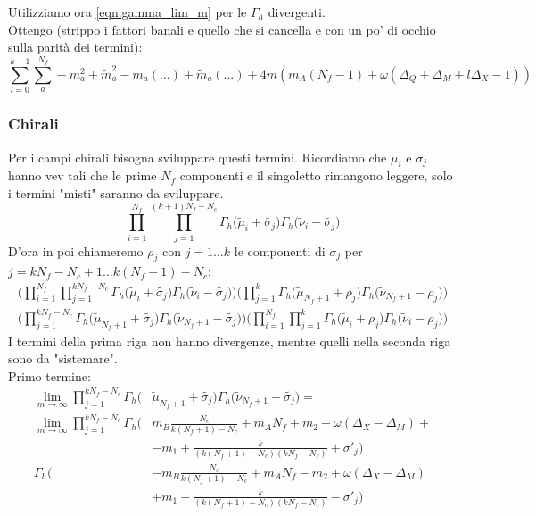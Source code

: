 \documentclass[a4paper,12pt]{article}
\begin{document}
Utilizziamo ora \ref{eqn:gamma_lim_m} per le $\Gamma_h$ divergenti.\\
Ottengo (strippo i fattori banali e quello che si cancella e con un po' di occhio sulla parità dei termini):
\begin{equation}
\sum_{l=0}^{k-1} \sum_a^{N_f}  - m_a^2 + \tilde{m}_a^2  -  m_a(\dots) + \tilde{m}_a(\dots) + 4  m ( m_A (N_f - 1)  + \omega( \Delta_Q +  \Delta_M + l\Delta_X  -1)  )
\label{eqn:contributo_mesoni}
\end{equation}

\subsubsection{Chirali}
Per i campi chirali bisogna sviluppare questi termini. Ricordiamo che $\mu_i$ e $\sigma_j$ hanno vev tali che le prime $N_f$ componenti e il singoletto rimangono leggere, solo i termini "misti" saranno da sviluppare.  
\begin{equation}
\prod_{i=1}^{N_f} \prod_{j=1}^{(k+1)N_f - N_c } \Gamma_h \big( \tilde \mu_i + \tilde{\sigma_j} \big) \Gamma_h \big( \tilde \nu_i - \tilde{\sigma_j} \big)  
\end{equation}
D'ora in poi chiameremo $\rho_j$ con $j= 1 \dots k$ le componenti di $\sigma_j$ per $ j = k N_f - N_c + 1 \dots k(N_f+1) -N_c$:
\begin{align*}
\bigg( \prod_{i=1}^{N_f} \prod_{j=1}^{k N_f - N_c } \Gamma_h \big( \tilde \mu_i + \tilde{\sigma_j} \big) \Gamma_h \big( \tilde \nu_i - \tilde{\sigma_j} \big) \bigg)
\bigg(\prod_{j=1}^{k} \Gamma_h \big( \tilde \mu_{N_f+1} + \rho_j \big) \Gamma_h \big( \tilde \nu_{N_f+1} - \rho_j \big) \bigg)\\
\bigg( \prod_{j=1}^{k N_f - N_c}   \Gamma_h \big( \tilde \mu_{N_f+1} + \tilde{\sigma_j} \big) \Gamma_h \big( \tilde \nu_{N_f+1} - \tilde{\sigma_j} \big) \bigg)
\bigg( \prod_{i=1}^{N_f} \prod_{j=1}^{k } \Gamma_h \big( \tilde \mu_i + \rho_j \big) \Gamma_h \big( \tilde \nu_i - \rho_j \big) \bigg)
\end{align*}
I termini della prima riga non hanno divergenze, mentre quelli nella seconda riga sono da "sistemare".\\
Primo termine:
\begin{align*}
\lim_{m \rightarrow \infty} \prod_{j=1}^{k N_f - N_c}   \Gamma_h \big(& \tilde \mu_{N_f+1} + \tilde{\sigma_j} \big) \Gamma_h \big( \tilde \nu_{N_f+1} - \tilde{\sigma_j} \big) =  \\
 \lim_{m \rightarrow \infty} \prod_{j=1}^{k N_f - N_c}   \Gamma_h \big(& m_B \frac{N_c}{k(N_f+1)-N_c } + m_A N_f + m_2 + \omega ( \Delta_X - \Delta_M) + \\
& - m_1  + \frac{k}{(k(N_f+1)-N_c) (k N_f - N_c) } + \sigma'_j \big) 
 \\
 \Gamma_h \big( &-  m_B \frac{N_c}{k(N_f+1)-N_c } + m_A N_f - m_2 + \omega ( \Delta_X - \Delta_M)  \\
&+ m_1  - \frac{k}{(k(N_f+1)-N_c) (k N_f - N_c) } - \sigma'_j \big) 
\end{align*}
\end{document}
